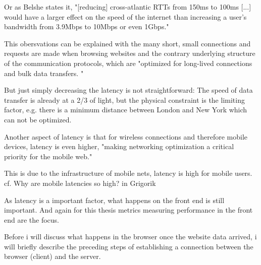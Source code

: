 Or as Belshe states it, "[reducing] cross-atlantic RTTs from 150ms to 100ms [...] would have a larger effect on the speed of the internet than increasing a user's bandwidth from 3.9Mbps to 10Mbps or even 1Gbps." %

This obersvations can be explained with the many short, small connections and requests are made when browsing websites and the contrary underlying structure of the communication protocols, which are "optimized for long-lived connections and bulk data transfers. " %

But just simply decreasing the latency is not straightforward: The speed of data transfer is already at a 2/3 of light, but the physical constraint is the limiting factor, e.g. there is a minimum distance between London and New York which can not be optimized. %



Another aspect of latency is that for wireless connections and therefore mobile devices, latency is even higher, "making networking optimization a critical priority for the mobile web." %

This is due to the infrastructure of mobile nets, latency is high for mobile users. cf.  Why are mobile latencies so high? in Grigorik %


As latency is a important factor, what happens on the front end is still important.
And again for this thesis metrics measuring performance in the front end are the focus.

Before i will discuss what happens in the browser once the website data arrived, i will briefly describe the preceding steps of establishing a connection between the browser (client) and the server.








